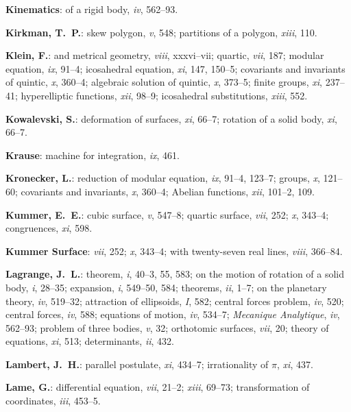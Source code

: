 \documentclass[11pt,a4paper]{article}
\newcommand{\IndexEntry}[1]{\textbf{#1}}
\newcommand{\V}[1]{\textit{#1}} %
\begin{document}
\IndexEntry{Kinematics}: of a rigid body, \V{iv}, 562--93.

\IndexEntry{Kirkman, T.\ P.}: skew polygon, \V{v}, 548; partitions of a polygon, \V{xiii}, 110.

\IndexEntry{Klein, F.}: and metrical geometry, \V{viii}, xxxvi--vii; quartic, \V{vii}, 187; modular equation, \V{ix}, 91--4; icosahedral equation, \V{xi}, 147, 150--5; covariants and invariants of quintic, \V{x}, 360--4; algebraic solution of quintic, \V{x}, 373--5; finite groups, \V{xi}, 237--41; hyperelliptic functions, \V{xii}, 98--9; icosahedral substitutions, \V{xiii}, 552.

\IndexEntry{Kowalevski, S.}: deformation of surfaces, \V{xi}, 66--7; rotation of a solid body, \V{xi}, 66--7.

\IndexEntry{Krause}: machine for integration, \V{ix}, 461.

\IndexEntry{Kronecker, L.}: reduction of modular equation, \V{ix}, 91--4, 123--7; groups, \V{x}, 121--60; covariants and invariants, \V{x}, 360--4; Abelian functions, \V{xii}, 101--2, 109.

\IndexEntry{Kummer, E.\ E.}: cubic surface, \V{v}, 547--8; quartic surface, \V{vii}, 252; \V{x}, 343--4; congruences, \V{xi}, 598.

\IndexEntry{Kummer Surface}: \V{vii}, 252; \V{x}, 343--4; with twenty-seven real lines, \V{viii}, 366--84.

\IndexEntry{Lagrange, J.\ L.}: theorem, \V{i}, 40--3, 55, 583; on the motion of rotation of a solid body, \V{i}, 28--35; expansion, \V{i}, 549--50, 584; theorems, \V{ii}, 1--7; on the planetary theory, \V{iv}, 519--32; attraction of ellipsoids, \V{I}, 582; central forces problem, \V{iv}, 520; central forces, \V{iv}, 588; equations of motion, \V{iv}, 534--7; \textit{Mecanique Analytique}, \V{iv}, 562--93; problem of three bodies, \V{v}, 32; orthotomic surfaces, \V{vii}, 20; theory of equations, \V{xi}, 513; determinants, \V{ii}, 432.

\IndexEntry{Lambert, J.\ H.}: parallel postulate, \V{xi}, 434--7; irrationality of $\pi$, \V{xi}, 437.

\IndexEntry{Lame, G.}: differential equation, \V{vii}, 21--2; \V{xiii}, 69--73; transformation of coordinates, \V{iii}, 453--5.

\newpage

\setcounter{page}{108}
\end{document}
